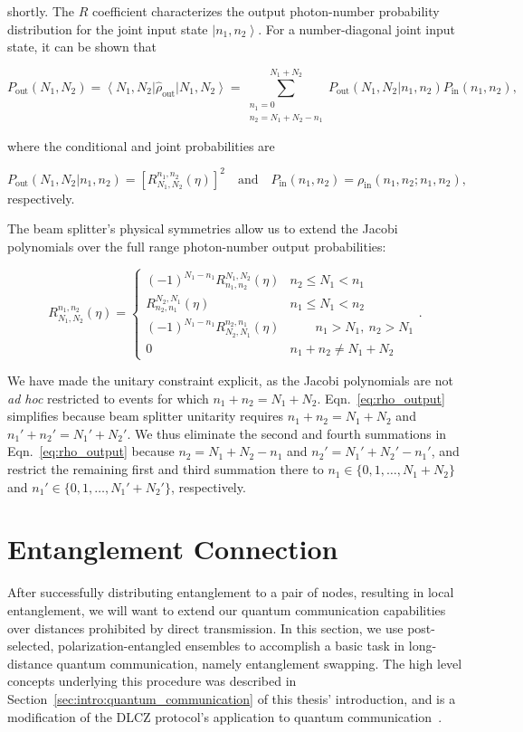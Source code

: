 \documentclass[aps,twocolumn,secnumarabic,amsmath,amssymb,pra,groupedaddress,
showpacs, showkeys]{revtex4-1}
\newcommand{\bra}[1]{\left\langle #1 \right|}
\newcommand{\ket}[1]{\left|#1\right\rangle}
\newcommand{\pna}[1]{\left(#1\right)}
\newcommand{\pnb}[1]{\left[#1\right]}
\newcommand{\eqn}[1]{
\begin{equation}
	#1
\end{equation}
}
\begin{document}
shortly. The $R$ coefficient characterizes the output photon-number probability
distribution for the joint input state $\ket{n_1,n_2}$. For a number-diagonal
joint input state, it can be shown that
\eqn{
    P_{\textrm{out}}\pna{N_1, N_2} = \bra{N_1, N_2} \hat{\rho}_{\textrm{out}}\ket{N_1, N_2}
    = \sum_{\substack{n_1=0\\n_2=N_1+N_2-n_1}}^{N_1+N_2}P_{\textrm{out}}\pna{N_1, N_2|n_1, n_2} P_{\textrm{in}}\pna{n_1, n_2},}
where the conditional and joint probabilities are 
\eqn{
P_{\textrm{out}}\pna{N_1, N_2|n_1, n_2} = \pnb{R_{N_1,N_2}^{n_1,n_2}\pna{\eta}}^2
\quad \textrm{and} \quad 
P_{\textrm{in}}\pna{n_1, n_2} = \rho_{\textrm{in}}\pna{n_1,n_2;n_1,n_2},
} respectively.

The beam splitter's physical symmetries allow us to extend the Jacobi
polynomials over the full range photon-number output probabilities:
\eqn{
   R_{N_1,N_2}^{n_1,n_2}\pna{\eta} = \left\{
     \begin{array}{lr}
        \pna{-1}^{N_1 - n_1} R_{n_1,n_2}^{N_1,N_2}\pna{\eta} & n_2 \leq N_1 < n_1 \\
       R_{n_2,n_1}^{N_2,N_1}\pna{\eta} & n_1 \leq N_1 < n_2 \\
	   \pna{-1}^{N_1 - n_1} R_{N_2,N_1}^{n_2,n_1}\pna{\eta} &\qquad n_1 > N_1,~n_2 > N_1 \\
	0 & n_1+n_2\neq N_1+N_2
     \end{array}
\right..}
We have made the unitary constraint explicit, as the Jacobi polynomials are not
\emph{ad hoc} restricted to events for which
$n_1+n_2=N_1+N_2$. Eqn.~\ref{eq:rho_output} simplifies because beam splitter
unitarity requires $n_1+n_2=N_1+N_2$ and $n_1'+n_2'=N_1'+N_2'$. We thus
eliminate the second and fourth summations in Eqn.~\ref{eq:rho_output} because
$n_2=N_1+N_2-n_1$ and $n_2'=N_1'+N_2'-n_1'$, and restrict the remaining first
and third summation there to $n_1\in\{0,1,\ldots,N_1+N_2\}$ and
$n_1'\in\{0,1,\ldots,N_1'+N_2'\}$, respectively.


\section{Entanglement Connection~\label{sec:herald:communication}}

After successfully distributing entanglement to a pair of nodes, resulting in
local entanglement, we will want to extend our quantum communication
capabilities over distances prohibited by direct transmission.  In this
section, we use post-selected, polarization-entangled ensembles to accomplish a
basic task in long-distance quantum communication, namely entanglement
swapping. The high level concepts underlying this procedure was described in
Section~\ref{sec:intro:quantum_communication} of this thesis' introduction, and
is a modification of the DLCZ protocol's application to quantum
communication~\cite{nature35106500}.
\end{document}
